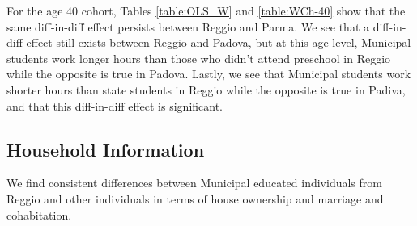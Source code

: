 \documentclass[11pt]{article}
\begin{document}
\begin{itemize}
\begin{itemize}
For the age 40 cohort, Tables \ref{table:OLS_W} and \ref{table:WCh-40} show that the same diff-in-diff effect persists between Reggio and Parma. We see that a diff-in-diff effect still exists between Reggio and Padova, but at this age level, Municipal students work longer hours than those who didn't attend preschool in Reggio while the opposite is true in Padova. Lastly, we see that Municipal students work shorter hours than state students in Reggio while the opposite is true in Padiva, and that this diff-in-diff effect is significant.

	\end{itemize}
	
\end{itemize}  

\subsection{Household Information}
We find consistent differences between Municipal educated individuals from Reggio and other individuals in terms of house ownership and marriage and cohabitation.
\end{document}
